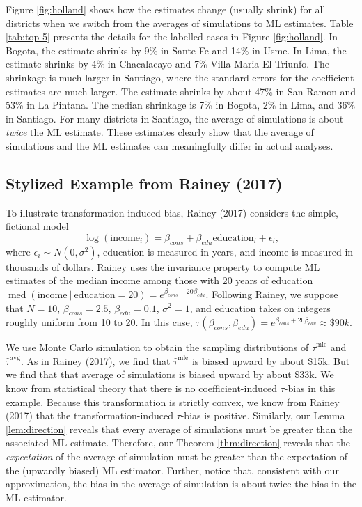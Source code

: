 \documentclass[11pt]{article}
\DeclareMathOperator{\med}{med}
\begin{document}
Figure \ref{fig:holland} shows how the estimates change (usually shrink) for all districts when we switch from the averages of simulations to ML estimates. Table \ref{tab:top-5} presents the details for the labelled cases in Figure \ref{fig:holland}. In Bogota, the estimate shrinks by 9\% in Sante Fe and 14\% in Usme. In Lima, the estimate shrinks by 4\% in Chacalacayo and 7\% Villa Maria El Triunfo. The shrinkage is much larger in Santiago, where the standard errors for the coefficient estimates are much larger. The estimate shrinks by about 47\% in San Ramon and 53\% in La Pintana. The median shrinkage is 7\% in Bogota, 2\% in Lima, and 36\% in Santiago. For many districts in Santiago, the average of simulations is about \textit{twice} the ML estimate. These estimates clearly show that the average of simulations and the ML estimates can meaningfully differ in actual analyses.



\subsection*{Stylized Example from Rainey (2017)}

To illustrate transformation-induced bias, Rainey (2017) considers the simple, fictional model
\begin{equation}
\log (\text{income}_i) = \beta_{cons} + \beta_{edu} \text{education}_i + \epsilon_i \text{,}\nonumber
\end{equation}
where $\epsilon_i \sim N(0, \sigma^2)$, education is measured in years, and income is measured in thousands of dollars. 
Rainey uses the invariance property to compute ML estimates of the median income among those with 20 years of education $\med(\text{income} ~|~ \text{education} = 20) = e^{\beta_{cons} + 20\beta_{edu}}$. 
Following Rainey, we suppose that $N = 10$, $\beta_{cons} = 2.5$, $\beta_{edu} = 0.1$, $\sigma^2 = 1$, and education takes on integers roughly uniform from 10 to 20.
In this case, $\tau(\beta_{cons}, \beta_{edu}) = e^{\beta_{cons} + 20\beta_{edu}} \approx \$90k$. 

We use Monte Carlo simulation to obtain the sampling distributions of $\hat{\tau}^\text{mle}$ and $\hat{\tau}^\text{avg}$. As in Rainey (2017), we find that $\hat{\tau}^\text{mle}$ is biased upward by about \$15k. But we find that that average of simulations is biased upward by about \$33k. We know from statistical theory that there is no coefficient-induced $\tau$-bias in this example. Because this transformation is strictly convex, we know from Rainey (2017) that the transformation-induced $\tau$-bias is positive. Similarly, our Lemma \ref{lem:direction} reveals that every average of simulations must be greater than the associated ML estimate. Therefore, our Theorem \ref{thm:direction} reveals that the \textit{expectation} of the average of simulation must be greater than the expectation of the (upwardly biased) ML estimator. Further, notice that, consistent with our approximation, the bias in the average of simulation is about twice the bias in the ML estimator.
\end{document}
